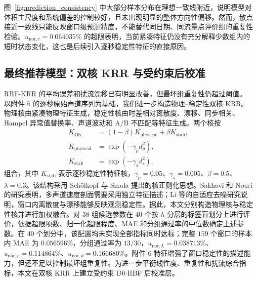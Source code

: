 图~\ref{fig:prediction_consistency} 中大部分样本分布在理想一致线附近，说明模型对体积主尺度和系统偏差的控制较好，且未出现明显的整体方向性偏移。然而，散点接近一致线只能反映窗口级预测精度，不能替代同日期、同流量点评价组的重复性检验。$u_{\mathrm{nor},r}=0.064035\%$ 的超限表明，当前紧凑特征仍没有充分解释少数组内的短时状态变化，这也是后续引入逐秒稳定性特征的直接原因。

\subsection{最终推荐模型：双核 KRR 与受约束后校准}

RBF-KRR 的平均误差和扰流漂移已有明显改善，但最坏组重复性仍超过阈值。以附件 6 的逐秒原始声道序列为基础，我们进一步构造物理--稳定性双核 KRR。物理核由紧凑物理特征生成，稳定性核由时差相对离散度、漂移、同步相关、Hampel 异常值替换率、声道波动和 A/B 不匹配等特征生成。两个核按
\begin{equation}
\begin{aligned}
K_{\mathrm{DK}}
&=(1-\beta)K_{\mathrm{physical}}+\beta K_{\mathrm{stab}},\\
K_{\mathrm{physical}}
&=\exp(-\gamma_p d_p^2),\\
K_{\mathrm{stab}}
&=\exp(-\gamma_s d_s^2).
\end{aligned}
\end{equation}
组合，其中 $K_{\mathrm{stab}}$ 表示逐秒稳定性特征核，$\gamma_p=0.05$、$\gamma_s=0.005$、$\beta=0.5$、$\lambda=0.3$。该结构采用 Sch\"olkopf 与 Smola 提出的核正则化思想\cite{Scholkopf2002LearningKernels}。Sakhavi 和 Nouri 的研究表明，多声道速度剖面需要采用独立特征描述\cite{Sakhavi2022GeneralizedProfile}；Li 等的自适应去噪研究说明，窗口内离散度与漂移能够反映观测稳定性\cite{Li2025VMDDenoising}。据此，本文分别构造物理核与稳定性核并进行加权融合。对 $38$ 组候选参数在 $40$ 个按 $h$ 分层的标签盲划分上进行评价，依据超限项数、归一化超限程度、MAE 和分组通过率的中位数确定上述参数。在 $40$ 个划分中，该配置均未实现全部指标同时达标；完整 $159$ 个窗口的样本内 MAE 为 $0.056596\%$，分组通过率为 $13/30$，$u_{\mathrm{nor},L}=0.038713\%$、$u_{\mathrm{nor},r}=0.114864\%$、$u_{\mathrm{nor},d}=0.166680\%$。附件 6 特征增强了窗口稳定性的描述能力，但还不足以控制最坏组重复性。为进一步平衡线性度、重复性和扰流综合指标，本文在双核 KRR 上建立受约束 D0-RBF 后校准层。


